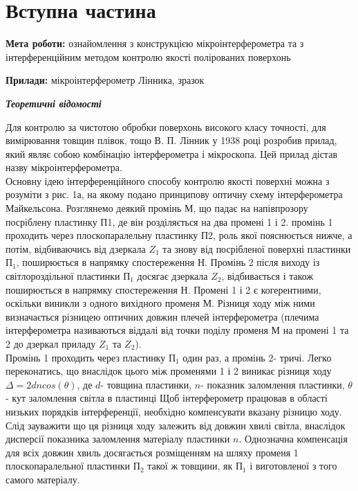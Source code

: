 \section{Вступна частина}
\setlength{\parindent}{4em}
\indent \textbf{Мета роботи:} ознайомлення з конструкцією мікроінтерферометра та з інтерференційним
методом контролю якості полірованих поверхонь \par
\textbf{Прилади:}  мікроінтерферометр Лінника, зразок
\begin{center}
\textbf{\emph{Теоретичні відомості}}
\end{center}
\indent Для контролю за чистотою обробки поверхонь високого класу точності, для
вимірювання товщин плівок, тощо В. П. Лінник у 1938 році розробив прилад, який являє собою
комбінацію інтерферометра і мікроскопа. Цей прилад дістав назву мікроінтерферометра.\\
Основну ідею інтерференційного способу контролю якості поверхні можна з
розуміти з рис. 1а, на якому подано принципову оптичну схему інтерферометра Майкельсона.
Розглянемо деякий промінь М, що падає на напівпрозору посріблену пластинку П1, де він
розділяється на два промені 1 і 2. промінь 1 проходить через плоскопаралельну пластинку П2,
роль якої пояснюється нижче, а потім, відбиваючись від дзеркала $Z_1$ та знову від посрібленої
поверхні пластинки $П_1$, поширюється в напрямку спостереження $Н$. Промінь 2 після виходу із
світлороздільної пластинки $П_1$ досягає дзеркала $Z_2$, відбивається і також поширюється в
напрямку спостереження $Н$. Промені 1 і 2 є когерентними, оскільки виникли з одного вихідного
променя $М$. Різниця ходу між ними визначається різницею оптичних довжин плечей
інтерферометра (плечима інтерферометра називаються віддалі від точки поділу променя М на
промені 1 та 2 до дзеркал приладу $Z_1$ та $Z_2$). \\
Промінь 1 проходить через пластинку $П_1$ один раз, а промінь 2- тричі. Легко
переконатись, що внаслідок цього між променями 1 і 2 виникає різниця ходу $\Delta = 2d n cos(\theta)$, де
$d$- товщина пластинки, $n$- показник заломлення пластинки, $\theta$ - кут заломлення світла в пластинці
 Щоб інтерферометр працював в області низьких порядків інтерференції, необхідно
компенсувати вказану різницю ходу. Слід зауважити що ця різниця ходу залежить від довжин
хвилі світла, внаслідок дисперсії показника заломлення матеріалу пластинки $n$. Однозначна
компенсація для всіх довжин хвиль досягається розміщенням на шляху променя 1
плоскопаралельної пластинки $П_2$ такої ж товщини, як $П_1$ і виготовленої з того самого матеріалу.
